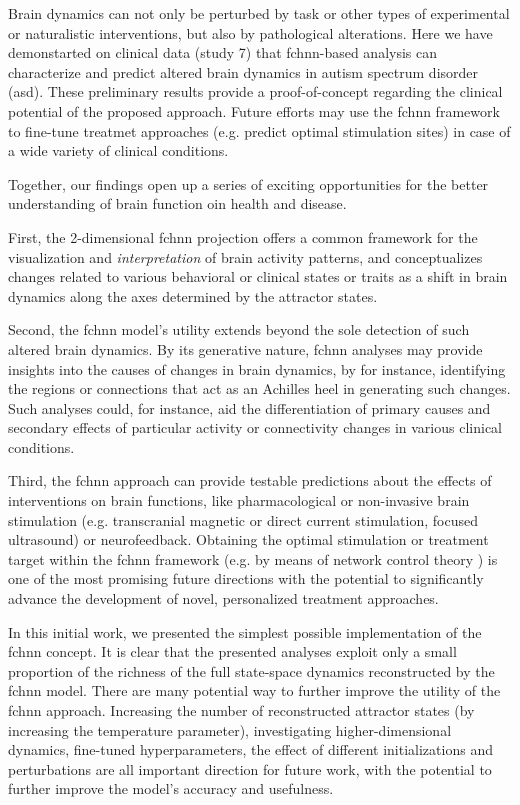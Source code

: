 \documentclass{article}
\begin{document}
Brain dynamics can not only be perturbed by task or other types of experimental or naturalistic interventions, but also by pathological alterations. Here we have demonstarted on clinical data (study 7) that \acrshort{fchnn}-based analysis can characterize and predict altered brain dynamics in autism spectrum disorder (\acrshort{asd}). These preliminary results provide a proof-of-concept regarding the clinical potential of the proposed approach. Future efforts may use the \acrshort{fchnn} framework to fine-tune treatmet approaches (e.g. predict optimal stimulation sites) in case of a wide variety of clinical conditions.

Together, our findings open up a series of exciting opportunities for the better understanding of brain function oin health and disease.

First, the 2-dimensional \acrshort{fchnn} projection offers a common framework for the visualization and \textit{interpretation} of brain activity patterns, and conceptualizes changes related to various behavioral or clinical states or traits as a shift in brain dynamics along the axes determined by the attractor states.

Second, the \acrshort{fchnn} model's utility extends beyond the sole detection of such altered brain dynamics. By its generative nature, \acrshort{fchnn} analyses may provide insights into the causes of changes in brain dynamics, by for instance, identifying the regions or connections that act as an Achilles heel in generating such changes. Such analyses could, for instance, aid the differentiation of primary causes and secondary effects of particular activity or connectivity changes in various clinical conditions.

Third, the \acrshort{fchnn} approach can provide testable predictions about the effects of interventions on brain functions, like pharmacological or non-invasive brain stimulation (e.g. transcranial magnetic or direct current stimulation,
focused ultrasound) or neurofeedback. Obtaining the optimal stimulation or treatment target within the \acrshort{fchnn} framework (e.g. by means of network control theory \citep{liu2011controllability}) is one of the most promising future directions with the potential to significantly advance the development of novel, personalized treatment approaches.

In this initial work, we presented the simplest possible implementation of the \acrshort{fchnn} concept. It is clear that the presented analyses exploit only a small proportion of the richness of the full state-space dynamics reconstructed by the \acrshort{fchnn} model.
There are many potential way to further improve the utility of the \acrshort{fchnn} approach. Increasing the number of reconstructed attractor states (by increasing the temperature parameter), investigating higher-dimensional dynamics, fine-tuned hyperparameters, the effect of
different initializations and perturbations are all important direction for future work, with the potential to further improve the model's accuracy and usefulness.
\end{document}
